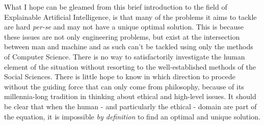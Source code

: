 What I hope can be gleamed from this brief introduction to the field of Explainable Artificial Intelligence, is that many of the problems it aims to tackle are hard \textit{per-se} and may not have a unique optimal solution.  This is because these issues are not only engineering problems, but exist at the intersection between man and machine and as such can't be tackled using only the methods of Computer Science.  There is no way to satisfactorily investigate the human element of the situation without resorting to the  well-established methods of the Social Sciences.  There is little hope to know in which direction to procede without the guiding force that can only come from philosophy, because of its millennia-long tradition in thinking about ethical and high-level issues.  
It should be clear that when the human - and particularly the ethical - domain are part of the equation, it is impossible \textit{by definition} to find an optimal and unique solution.

